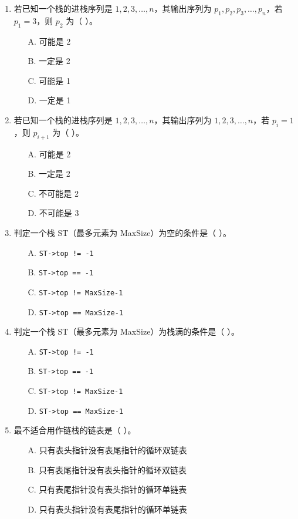 \documentclass[12pt, a4paper]{article}
\begin{document}
\begin{enumerate}
    \item 若已知一个栈的进栈序列是 $1, 2, 3, \dots, n$，其输出序列为 $p_1, p_2, p_3, \dots, p_n$，若 $p_1=3$，则 $p_2$ 为（ ）。
    \begin{enumerate}
        \item[A.] 可能是 2
        \item[B.] 一定是 2
        \item[C.] 可能是 1
        \item[D.] 一定是 1
    \end{enumerate}
    
    \item 若已知一个栈的进栈序列是 $1, 2, 3, \dots, n$，其输出序列为 $1, 2, 3, \dots, n$，若 $p_i=1$，则 $p_{i+1}$ 为（ ）。
    \begin{enumerate}
        \item[A.] 可能是 2
        \item[B.] 一定是 2
        \item[C.] 不可能是 2
        \item[D.] 不可能是 3
    \end{enumerate}
    
    \item 判定一个栈 ST（最多元素为 MaxSize）为空的条件是（ ）。
    \begin{enumerate}
        \item[A.] \texttt{ST->top != -1}
        \item[B.] \texttt{ST->top == -1}
        \item[C.] \texttt{ST->top != MaxSize-1}
        \item[D.] \texttt{ST->top == MaxSize-1}
    \end{enumerate}
    
    \item 判定一个栈 ST（最多元素为 MaxSize）为栈满的条件是（ ）。
    \begin{enumerate}
        \item[A.] \texttt{ST->top != -1}
        \item[B.] \texttt{ST->top == -1}
        \item[C.] \texttt{ST->top != MaxSize-1}
        \item[D.] \texttt{ST->top == MaxSize-1}
    \end{enumerate}
    
    \item 最不适合用作链栈的链表是（ ）。
    \begin{enumerate}
        \item[A.] 只有表头指针没有表尾指针的循环双链表
        \item[B.] 只有表尾指针没有表头指针的循环双链表
        \item[C.] 只有表尾指针没有表头指针的循环单链表
        \item[D.] 只有表头指针没有表尾指针的循环单链表
    \end{enumerate}
    

\end{enumerate}
\end{document}
